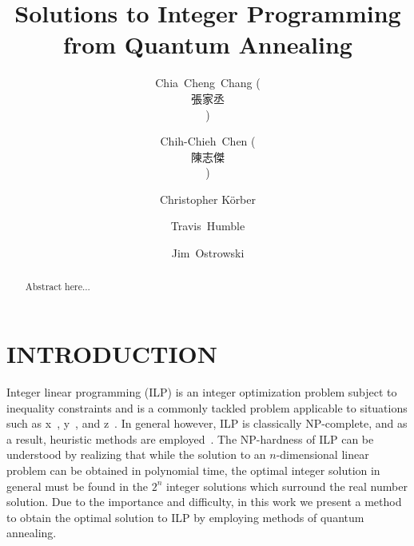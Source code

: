 \documentclass[prd,twocolumn,tightenlines,preprintnumbers,showpacs,superscriptaddress,notitlepage,nofootinbib,eqsecnum,
floatfix,longbibliography,aps,10pt]{revtex4-2}
\begin{document}
\title{Solutions to Integer Programming from Quantum Annealing}

\author{Chia~Cheng~Chang (\begin{CJK*}{UTF8}{bsmi}張家丞\end{CJK*})}
	\author{Chih-Chieh~Chen (\begin{CJK*}{UTF8}{bsmi}\mbox{陳志傑}\end{CJK*})}
\author{Christopher K\"orber}
\author{Travis~Humble}
\author{Jim~Ostrowski}

\begin{abstract}
Abstract here...
\end{abstract}


\maketitle

\flushbottom
\maketitle

\section{INTRODUCTION}
\label{sec:introduction}

Integer linear programming (ILP) is an integer optimization problem subject to inequality constraints and is a commonly tackled problem applicable to situations such as x~\cite{}, y~\cite{}, and z~\cite{}. In general however, ILP is classically NP-complete, and as a result, heuristic methods are employed~\cite{}. The NP-hardness of ILP can be understood by realizing that while the solution to an $n$-dimensional linear problem can be obtained in polynomial time, the optimal integer solution in general must be found in the $2^n$ integer solutions which surround the real number solution. Due to the importance and difficulty, in this work we present a method to obtain the optimal solution to ILP by employing methods of quantum annealing.
\end{document}
